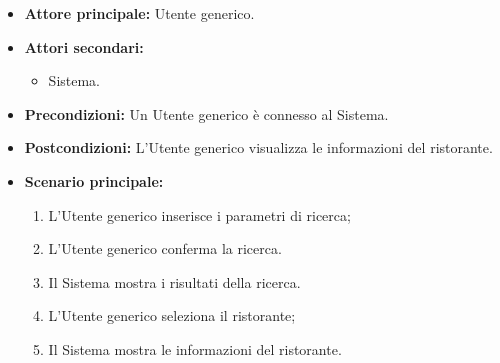 \label{usecase:Visualizzazione di un ristorante}
\begin{itemize}
	\item \textbf{Attore principale:} Utente generico.

	\item \textbf{Attori secondari:}
	      \begin{itemize}
		      \item Sistema.
	      \end{itemize}

	\item \textbf{Precondizioni:}
	      Un Utente generico è connesso al Sistema.

	\item \textbf{Postcondizioni:}
	      L'Utente generico visualizza le informazioni del ristorante.

	\item \textbf{Scenario principale:}
	      \begin{enumerate}
		      \item L'Utente generico inserisce i parametri di ricerca;
		      \item L'Utente generico conferma la ricerca.
		      \item Il Sistema mostra i risultati della ricerca.
		      \item L'Utente generico seleziona il ristorante;
		      \item Il Sistema mostra le informazioni del ristorante.
	      \end{enumerate}
\end{itemize}
